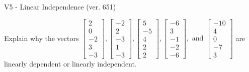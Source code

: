 \begin{exercise}
  \begin{exerciseTitle}V5 - Linear Independence (ver. 651)\end{exerciseTitle}
  \begin{exerciseStatement}
    Explain why the vectors \(\left[\begin{array}{r}
2 \\
0 \\
-2 \\
3 \\
-3
\end{array}\right] , \left[\begin{array}{r}
-2 \\
2 \\
-3 \\
1 \\
-3
\end{array}\right] , \left[\begin{array}{r}
5 \\
-5 \\
4 \\
2 \\
2
\end{array}\right] , \left[\begin{array}{r}
-6 \\
3 \\
-1 \\
-2 \\
-6
\end{array}\right] , \text{ and } \left[\begin{array}{r}
-10 \\
4 \\
0 \\
-7 \\
3
\end{array}\right]\) are linearly dependent or linearly independent.	



\end{exerciseStatement}
\end{exercise}
